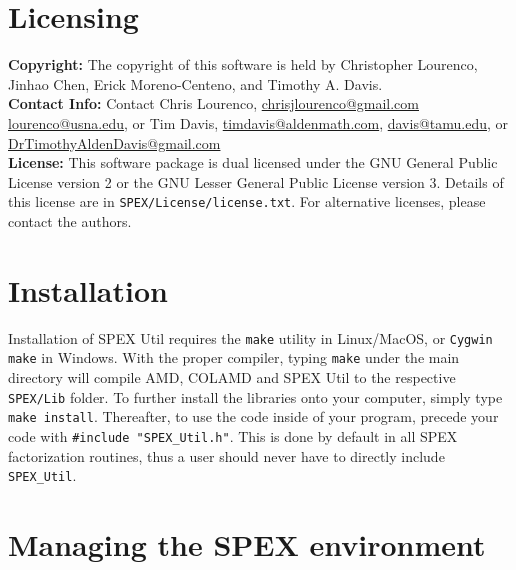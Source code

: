 \documentclass[12pt]{report}
\theoremstyle{definition}
\begin{document}
\section{Licensing} \label{s:util:licensing}

\textbf{Copyright:} The copyright of this software is held by Christopher Lourenco, Jinhao Chen, Erick Moreno-Centeno, and Timothy A. Davis.\\

\noindent \textbf{Contact Info:} Contact Chris Lourenco,
\href{mailto:chrisjlourenco@gmail.com}{chrisjlourenco@gmail.com} \href{mailto:lourenco@usna.edu}{lourenco@usna.edu}, or Tim Davis,
\href{mailto:timdavis@aldenmath.com}{timdavis@aldenmath.com},
\href{mailto:davis@tamu.edu}{davis@tamu.edu}, or
\href{DrTimothyAldenDavis@gmail.com}{DrTimothyAldenDavis@gmail.com}\\

\noindent \textbf{License:} This software package is dual licensed under the GNU General Public License version 2 or the GNU Lesser General Public License version 3. Details of this license are in \verb|SPEX/License/license.txt|. For alternative licenses, please contact the authors.


\section{Installation} \label{s:install}

Installation of SPEX Util requires the \verb|make| utility in Linux/MacOS, or
\verb|Cygwin make| in Windows. With the proper compiler, typing \verb|make|
under the main directory will compile AMD, COLAMD and SPEX Util to the respective
\verb|SPEX/Lib| folder. To further install the libraries onto your computer,
simply type \verb|make install|.  Thereafter, to use the code inside of your
program, precede your code with \newline \verb|#include "SPEX_Util.h"|. This is done
by default in all SPEX factorization routines, thus a user should never have to
directly include \verb|SPEX_Util|.

\section{Managing the SPEX environment} \label{s:user:setup}
\end{document}
